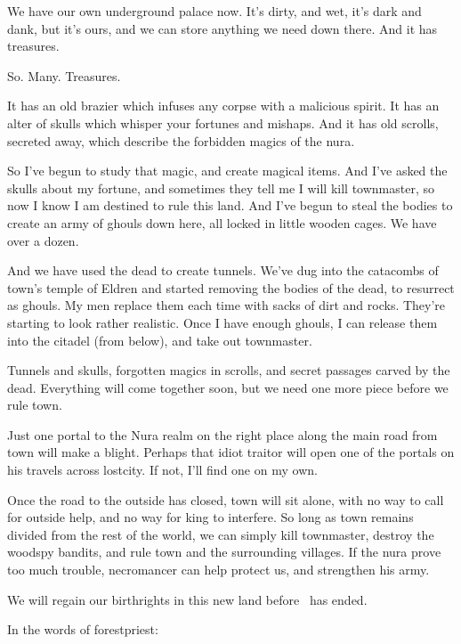 \begin{multicols}{2}
\begin{exampletext}
  We have our own underground palace now.
  It's dirty, and wet, it's dark and dank, but it's ours, and we can store anything we need down there.
  And it has treasures.

  So. Many. Treasures.

  It has an old brazier which infuses any corpse with a malicious spirit.
  It has an alter of skulls which whisper your fortunes and mishaps.
  And it has old scrolls, secreted away, which describe the forbidden magics of the nura.
  
  So I've begun to study that magic, and create magical items.
  And I've asked the skulls about my fortune, and sometimes they tell me I will kill \gls{townmaster}, so now I know I am destined to rule this land.
  And I've begun to steal the bodies to create an army  of ghouls down here, all locked in little wooden cages.
  We have over a dozen.

  And we have used the dead to create tunnels.
  We've dug into the catacombs of \gls{town}'s temple of Eldren and started removing the bodies of the dead, to resurrect as ghouls.
  My men replace them each time with sacks of dirt and rocks.
  They're starting to look rather realistic.
  Once I have enough ghouls, I can release them into the citadel (from below), and take out \gls{townmaster}.

  Tunnels and skulls, forgotten magics in scrolls, and secret passages carved by the dead.
  Everything will come together soon, but we need one more piece before we rule \gls{town}.

  Just one portal to the Nura realm on the right place along the main road from \gls{town} will make a \gls{blight}.
  Perhaps that idiot \gls{traitor} will open one of the portals on his travels across \gls{lostcity}.
  If not, I'll find one on my own.

  Once the road to the outside has closed, \gls{town} will sit alone, with no way to call for outside help, and no way for \gls{king} to interfere.
  So long as \gls{town} remains divided from the rest of the world, we can simply kill \gls{townmaster}, destroy the woodspy bandits, and rule \gls{town} and the surrounding \glspl{village}.
  If the nura prove too much trouble, \gls{necromancer} can help protect us, and strengthen his army.

  We will regain our birthrights in this new land before \season\ has ended.

\end{exampletext}

In the words of \gls{forestpriest}:


\end{multicols}
